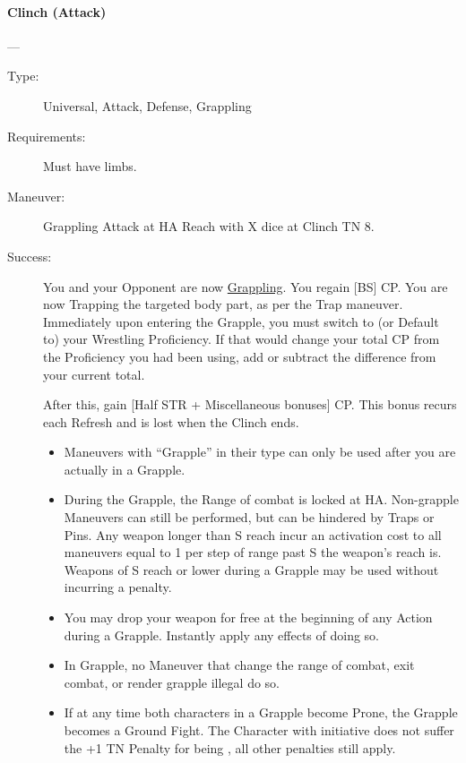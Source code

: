 \documentclass[oneside,11pt,english]{book}
\begin{document}
\paragraph{\large\label{man:Clinch (Attack)}Clinch (Attack)}---\quad{\large[X]}
\vspace{-10pt}\begin{description} 
\item [Type:] Universal, Attack, Defense, Grappling 
\item [Requirements:] Must have limbs. 
\item [Maneuver:] Grappling Attack at HA Reach with X dice at Clinch TN 8. 
\item [Success:] You and your Opponent are now
  \hyperref[sec:Grappling]{Grappling}. You regain [BS] CP. You are now Trapping %
  the targeted body part, as per the Trap maneuver. Immediately upon entering
  the Grapple, you must switch to (or Default to) your Wrestling Proficiency. If
  that would change your total CP from the Proficiency you had been using, add
  or subtract the difference from your current total. 

  After this, gain [Half STR + Miscellaneous bonuses] CP. This bonus recurs each
  Refresh and is lost when the Clinch ends.  
\begin{itemize}
  \item Maneuvers with “Grapple” in their type can only be used after you are
  actually in a Grapple.  

  \item During the Grapple, the Range of combat is locked at HA. Non-grapple
    Maneuvers can still be performed, but can be hindered by Traps or Pins. Any %
    weapon longer than S reach incur an activation cost to all maneuvers equal
    to 1 per step of range past S the weapon’s reach is. Weapons of S reach or
    lower during a Grapple may be used without incurring a penalty.

  \item You may drop your weapon for free at the beginning of any Action during
    a Grapple. Instantly apply any effects of doing so.  
  
  \item In Grapple, no Maneuver that change the range of combat, exit combat, or
    render grapple illegal do so.   

  \item If at any time both characters in a Grapple become Prone, the Grapple
    becomes a Ground Fight. The Character with initiative does not suffer the +1
    TN Penalty for being , all other penalties still apply. 


\end{itemize}
\end{description}
\end{document}
